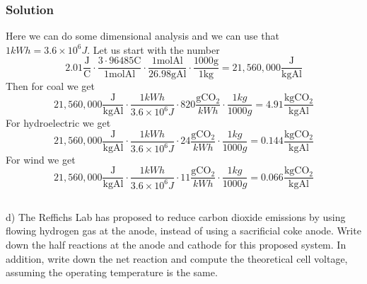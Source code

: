 \documentclass[12pt]{article}
\begin{document}
\subsubsection{Solution}
Here we can do some dimensional analysis and we can use that $1 kWh = 3.6 \times 10^{6} J$. Let us start with the number
\begin{equation}
    2.01 \frac{\mathrm{J}}{\mathrm{C}} \cdot \frac{3 \cdot 96485 \mathrm{C}}{1 \mathrm{mol} \mathrm{Al}} \cdot \frac{1 \mathrm{mol} \mathrm{Al}}{26.98 \mathrm{g} \mathrm{Al}} \cdot \frac{1000 \mathrm{g}}{1 \mathrm{kg}} = 21,560,000 \frac{\mathrm{J}}{\mathrm{kg} \mathrm{Al}}
\end{equation}
Then for coal we get
\begin{equation}
    21,560,000 \frac{\mathrm{J}}{\mathrm{kg} \mathrm{Al}} \cdot \frac{1 kWh}{3.6 \times 10^{6} J} \cdot 820 \frac{\mathrm{g} \mathrm{CO}_{2}}{kWh} \cdot \frac{1 kg}{1000 g} = 4.91 \frac{\mathrm{kg} \mathrm{CO}_{2}}{\mathrm{kg} \mathrm{Al}}
\end{equation}
For hydroelectric we get
\begin{equation}
    21,560,000 \frac{\mathrm{J}}{\mathrm{kg} \mathrm{Al}} \cdot \frac{1 kWh}{3.6 \times 10^{6} J} \cdot 24 \frac{\mathrm{g} \mathrm{CO}_{2}}{kWh} \cdot \frac{1 kg}{1000 g} = 0.144 \frac{\mathrm{kg} \mathrm{CO}_{2}}{\mathrm{kg} \mathrm{Al}}
\end{equation}
For wind we get
\begin{equation}
    21,560,000 \frac{\mathrm{J}}{\mathrm{kg} \mathrm{Al}} \cdot \frac{1 kWh}{3.6 \times 10^{6} J} \cdot 11 \frac{\mathrm{g} \mathrm{CO}_{2}}{kWh} \cdot \frac{1 kg}{1000 g} = 0.066 \frac{\mathrm{kg} \mathrm{CO}_{2}}{\mathrm{kg} \mathrm{Al}}
\end{equation}
\subsection{}
d) The Reffichs Lab has proposed to reduce carbon dioxide emissions by using flowing hydrogen gas at the anode, instead of using a sacrificial coke anode. Write down the half reactions at the anode and cathode for this proposed system. In addition, write down the net reaction and compute the theoretical cell voltage, assuming the operating temperature is the same.\\
\end{document}
